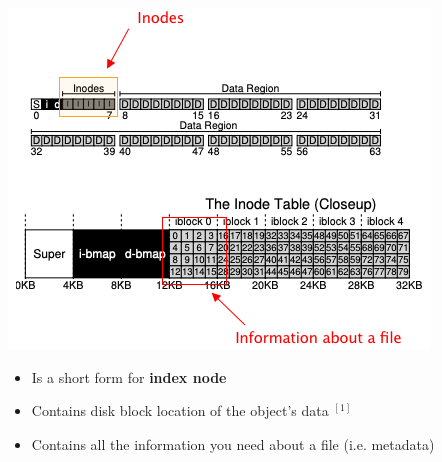 \documentclass[12pt]{article}
\begin{document}
\begin{enumerate}[1.]
\begin{enumerate}[a)]
\begin{itemize}
            \begin{center}
            \includegraphics[width=\linewidth]{images/midterm_1_solution_12.png}
            \end{center}

            \begin{itemize}
                \item Is a short form for \textbf{index node}
                \item Contains disk block location of the object's data $^{[1]}$
                \item Contains all the information you need about a file (i.e. metadata)


\end{itemize}
\end{itemize}
\end{enumerate}
\end{enumerate}
\end{document}
